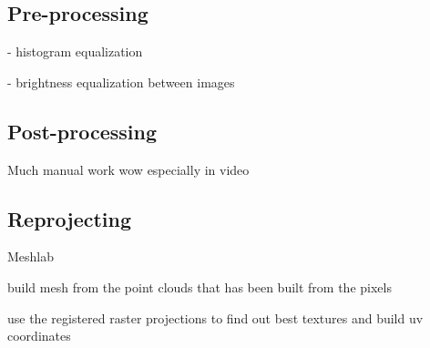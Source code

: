 \subsection{Pre-processing}
- histogram equalization

- brightness equalization between images



\subsection{Post-processing}

Much manual work wow especially in video

\subsection{Reprojecting}

Meshlab

build mesh from the point clouds that has been built from the pixels

use the registered raster projections to find out best textures and build uv coordinates

